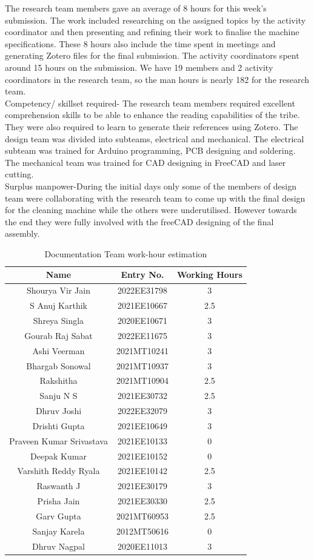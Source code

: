 \documentclass[12pt]{article} %
\begin{document}
The research team members gave an average of 8 hours for this week's submission. The work included researching on the assigned topics by the activity coordinator and then presenting and refining their work to finalise the machine specifications. These 8 hours also include the time spent in meetings and generating Zotero files for the final submission. The activity coordinators spent around 15 hours on the submission. We have 19 members and 2 activity coordinators in the research team, so the man hours is nearly 182 for the research team.
\\Competency/ skillset required- The research team members required excellent comprehension skills to be able to enhance the reading capabilities of the tribe. They were also required to learn to generate their references using Zotero. The design team was divided into subteams, electrical and mechanical. The electrical subteam was trained for Arduino programming, PCB designing and soldering. The mechanical team was trained for CAD designing in FreeCAD and laser cutting.
\\Surplus manpower-During the initial days only some of the members of design team were collaborating with the research team to come up with the final design for the cleaning machine while the others were underutilised. However towards the end they were fully involved with the freeCAD designing of the final assembly.

\begin{table}[h]
\centering
\begin{tabular}{|c|c|c|}
\hline
Name & Entry No. & Working Hours \\
\hline
Shourya Vir Jain & 2022EE31798 & 3 \\
S Anuj Karthik & 2021EE10667 & 2.5 \\
Shreya Singla & 2020EE10671 & 3 \\
Gourab Raj Sabat & 2022EE11675 & 3 \\
Ashi Veerman & 2021MT10241 & 3 \\
Bhargab Sonowal & 2021MT10937 & 3 \\
Rakshitha & 2021MT10904 & 2.5 \\
Sanju N S & 2021EE30732 & 2.5 \\    
Dhruv Joshi & 2022EE32079 & 3 \\
Drishti Gupta & 2021EE10649 & 3 \\
Praveen Kumar Srivastava & 2021EE10133 & 0 \\
Deepak Kumar & 2021EE10152 & 0 \\
Varshith Reddy Ryala & 2021EE10142 & 2.5 \\
Raswanth J & 2021EE30179 & 3 \\
Prisha Jain & 2021EE30330 & 2.5 \\
Garv Gupta & 2021MT60953 & 2.5 \\
Sanjay Karela & 2012MT50616 & 0 \\
Dhruv Nagpal & 2020EE11013 & 3 \\
\hline
\end{tabular}
\caption{Documentation Team work-hour estimation}
\label{tab:teamDetails}
\end{table}
\end{document}

